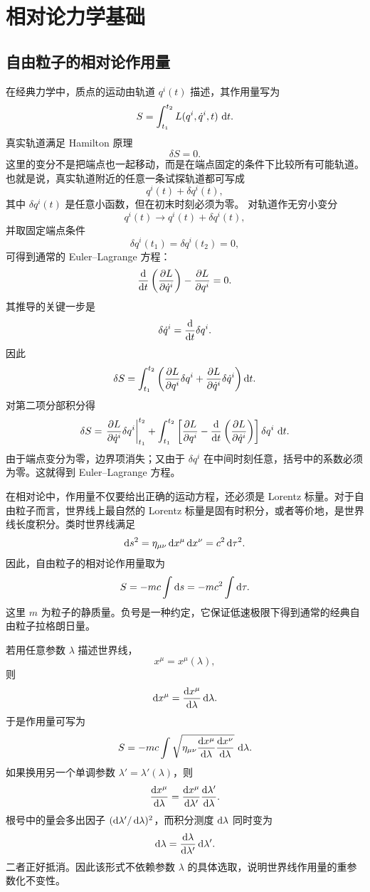 \chapter{相对论力学基础}

\section{自由粒子的相对论作用量}

在经典力学中，质点的运动由轨道 $q^{i}(t)$ 描述，其作用量写为
\[
S=\int_{t_{1}}^{t_{2}}L(q^{i},\dot q^{i},t)\,\mathop{}\!\mathrm{d} t .
\]
真实轨道满足 Hamilton 原理
\[
\delta S=0 .
\]
这里的变分不是把端点也一起移动，而是在端点固定的条件下比较所有可能轨道。也就是说，真实轨道附近的任意一条试探轨道都可写成
\[
q^{i}(t)+\delta q^{i}(t),
\]
其中 $\delta q^{i}(t)$ 是任意小函数，但在初末时刻必须为零。
对轨道作无穷小变分
\[
q^{i}(t)\longrightarrow q^{i}(t)+\delta q^{i}(t),
\]
并取固定端点条件
\[
\delta q^{i}(t_{1})=\delta q^{i}(t_{2})=0,
\]
可得到通常的 Euler--Lagrange 方程：
\[
\frac{\mathop{}\!\mathrm{d}}{\mathop{}\!\mathrm{d} t}\left(\frac{\partial L}{\partial \dot q^{i}}\right)
-
\frac{\partial L}{\partial q^{i}}
=0 .
\]
其推导的关键一步是
\[
\delta\dot q^{i}
=\frac{\mathop{}\!\mathrm{d}}{\mathop{}\!\mathrm{d} t}\delta q^{i}.
\]
因此
\[
\delta S
=
\int_{t_{1}}^{t_{2}}
\left(
\frac{\partial L}{\partial q^{i}}\delta q^{i}
+
\frac{\partial L}{\partial \dot q^{i}}\delta\dot q^{i}
\right)\mathop{}\!\mathrm{d} t .
\]
对第二项分部积分得
\[
\delta S
=
\left.
\frac{\partial L}{\partial \dot q^{i}}\delta q^{i}
\right|_{t_{1}}^{t_{2}}
+
\int_{t_{1}}^{t_{2}}
\left[
\frac{\partial L}{\partial q^{i}}
-
\frac{\mathop{}\!\mathrm{d}}{\mathop{}\!\mathrm{d} t}
\left(\frac{\partial L}{\partial \dot q^{i}}\right)
\right]\delta q^{i}\,\mathop{}\!\mathrm{d} t .
\]
由于端点变分为零，边界项消失；又由于 $\delta q^{i}$ 在中间时刻任意，括号中的系数必须为零。这就得到 Euler--Lagrange 方程。

在相对论中，作用量不仅要给出正确的运动方程，还必须是 Lorentz 标量。对于自由粒子而言，世界线上最自然的 Lorentz 标量是固有时积分，或者等价地，是世界线长度积分。类时世界线满足
\[
\mathop{}\!\mathrm{d} s^{2}=\eta_{\mu\nu}\mathop{}\!\mathrm{d} x^{\mu}\mathop{}\!\mathrm{d} x^{\nu}=c^{2}\mathop{}\!\mathrm{d}\tau^{2}.
\]
因此，自由粒子的相对论作用量取为
\[
S=-mc\int \mathop{}\!\mathrm{d} s=-mc^{2}\int \mathop{}\!\mathrm{d}\tau .
\]
这里 $m$ 为粒子的静质量。负号是一种约定，它保证低速极限下得到通常的经典自由粒子拉格朗日量。

若用任意参数 $\lambda$ 描述世界线，
\[
x^{\mu}=x^{\mu}(\lambda),
\]
则
\[
\mathop{}\!\mathrm{d} x^{\mu}=\frac{\mathop{}\!\mathrm{d} x^{\mu}}{\mathop{}\!\mathrm{d}\lambda}\mathop{}\!\mathrm{d}\lambda.
\]
于是作用量可写为
\[
S=-mc\int
\sqrt{\eta_{\mu\nu}
	\frac{\mathop{}\!\mathrm{d} x^{\mu}}{\mathop{}\!\mathrm{d}\lambda}
	\frac{\mathop{}\!\mathrm{d} x^{\nu}}{\mathop{}\!\mathrm{d}\lambda}}
\,\mathop{}\!\mathrm{d}\lambda .
\]
如果换用另一个单调参数 $\lambda'=\lambda'(\lambda)$，则
\[
\frac{\mathop{}\!\mathrm{d} x^{\mu}}{\mathop{}\!\mathrm{d}\lambda}
=
\frac{\mathop{}\!\mathrm{d} x^{\mu}}{\mathop{}\!\mathrm{d}\lambda'}
\frac{\mathop{}\!\mathrm{d}\lambda'}{\mathop{}\!\mathrm{d}\lambda}.
\]
根号中的量会多出因子 $(\mathop{}\!\mathrm{d}\lambda'/\mathop{}\!\mathrm{d}\lambda)^{2}$，而积分测度 $\mathop{}\!\mathrm{d}\lambda$ 同时变为
\[
\mathop{}\!\mathrm{d}\lambda
=
\frac{\mathop{}\!\mathrm{d}\lambda}{\mathop{}\!\mathrm{d}\lambda'}\mathop{}\!\mathrm{d}\lambda' .
\]
二者正好抵消。因此该形式不依赖参数 $\lambda$ 的具体选取，说明世界线作用量的重参数化不变性。

